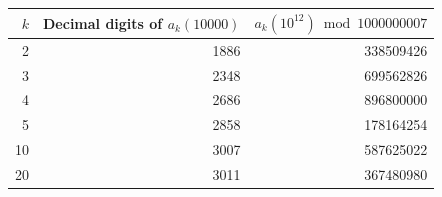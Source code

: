 \begin{center}
\begin{tabular}{@{}rrr@{}}
\toprule
$k$ & Decimal digits of $a_k(10000)$ & $a_k(10^{12})\bmod 1000000007$\\
\midrule
2 & 1886 & 338509426\\
3 & 2348 & 699562826\\
4 & 2686 & 896800000\\
5 & 2858 & 178164254\\
10 & 3007 & 587625022\\
20 & 3011 & 367480980\\
\bottomrule
\end{tabular}
\end{center}
